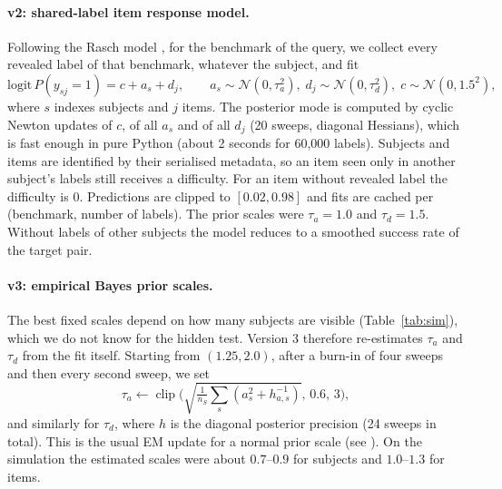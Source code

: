 \documentclass{article}
\begin{document}
\paragraph{v2: shared-label item response model.} Following the Rasch model \citep{rasch1960}, for the benchmark of the query, we collect every revealed label of that benchmark, whatever the subject, and fit
\[
\mathrm{logit}\,P(y_{sj}=1) = c + a_s + d_j,\qquad a_s\sim\mathcal N(0,\tau_a^2),\; d_j\sim\mathcal N(0,\tau_d^2),\; c\sim\mathcal N(0,1.5^2),
\]
where $s$ indexes subjects and $j$ items. The posterior mode is computed by cyclic Newton updates of $c$, of all $a_s$ and of all $d_j$ (20 sweeps, diagonal Hessians), which is fast enough in pure Python (about 2 seconds for 60{,}000 labels). Subjects and items are identified by their serialised metadata, so an item seen only in another subject's labels still receives a difficulty. For an item without revealed label the difficulty is $0$. Predictions are clipped to $[0.02,0.98]$ and fits are cached per (benchmark, number of labels). The prior scales were $\tau_a=1.0$ and $\tau_d=1.5$. Without labels of other subjects the model reduces to a smoothed success rate of the target pair.

\paragraph{v3: empirical Bayes prior scales.} The best fixed scales depend on how many subjects are visible (Table~\ref{tab:sim}), which we do not know for the hidden test. Version 3 therefore re-estimates $\tau_a$ and $\tau_d$ from the fit itself. Starting from $(1.25, 2.0)$, after a burn-in of four sweeps and then every second sweep, we set
\[
\tau_a \leftarrow \operatorname{clip}\Big(\sqrt{\tfrac1{n_S}\textstyle\sum_s (a_s^2 + h_{a,s}^{-1})},\,0.6,\,3\Big),
\]
and similarly for $\tau_d$, where $h$ is the diagonal posterior precision (24 sweeps in total). This is the usual EM update for a normal prior scale (see \citealp{efron1973stein}). On the simulation the estimated scales were about $0.7$--$0.9$ for subjects and $1.0$--$1.3$ for items.
\end{document}
